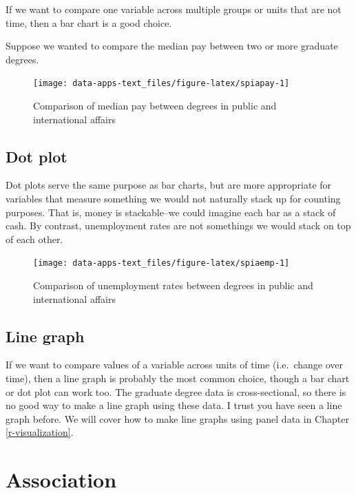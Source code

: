 \documentclass[
]{book}
\begin{document}
If we want to compare one variable across multiple groups or units that are not time, then a bar chart is a good choice.

Suppose we wanted to compare the median pay between two or more graduate degrees.

\begin{figure}

{\centering \texttt{[image: data-apps-text\_files/figure-latex/spiapay-1]} 

}

\caption{Comparison of median pay between degrees in public and international affairs}\label{fig:spiapay}
\end{figure}

\hypertarget{dot-plot}{%
\subsection{Dot plot}\label{dot-plot}}

Dot plots serve the same purpose as bar charts, but are more appropriate for variables that measure something we would not naturally stack up for counting purposes. That is, money is stackable--we could imagine each bar as a stack of cash. By contrast, unemployment rates are not somethings we would stack on top of each other.

\begin{figure}

{\centering \texttt{[image: data-apps-text\_files/figure-latex/spiaemp-1]} 

}

\caption{Comparison of unemployment rates between degrees in public and international affairs}\label{fig:spiaemp}
\end{figure}

\hypertarget{line-graph}{%
\subsection{Line graph}\label{line-graph}}

If we want to compare values of a variable across units of time (i.e.~change over time), then a line graph is probably the most common choice, though a bar chart or dot plot can work too. The graduate degree data is cross-sectional, so there is no good way to make a line graph using these data. I trust you have seen a line graph before. We will cover how to make line graphs using panel data in Chapter \ref{r-visualization}.

\hypertarget{association}{%
\section{Association}\label{association}}
\end{document}
